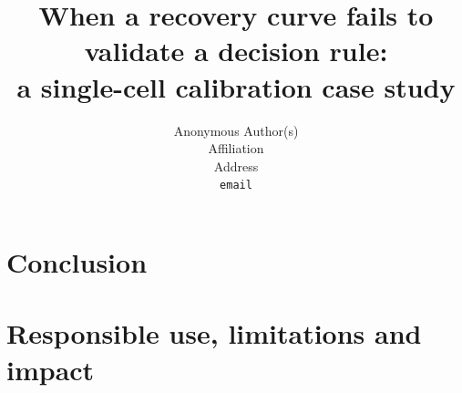 \documentclass{article}
\title{When a recovery curve fails to validate a decision rule:\\
a single-cell calibration case study}
\author{%
  Anonymous Author(s) \\
  Affiliation \\
  Address \\
  \texttt{email} \\
}
\begin{document}
\maketitle











\section{Conclusion}
\label{sec:conclusion}



\section{Responsible use, limitations and impact}
\label{sec:responsible}



\clearpage



\clearpage


\end{document}
